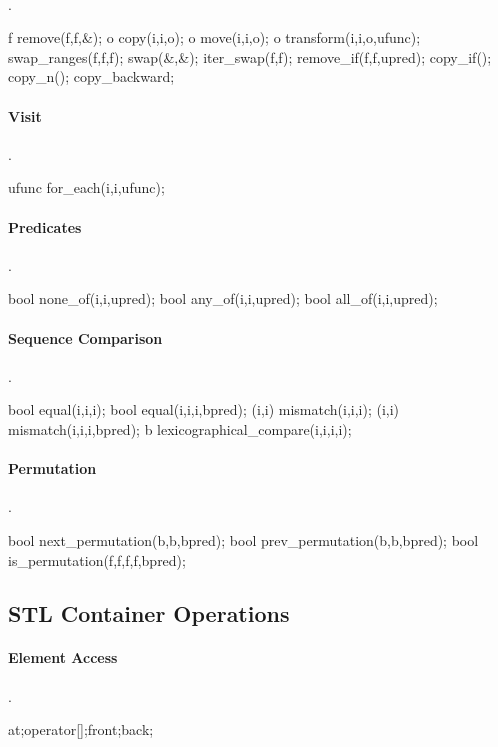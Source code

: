 \paragraph{}{.}
\begin{code}
f remove(f,f,&); o copy(i,i,o); o move(i,i,o);
o transform(i,i,o,ufunc);
swap_ranges(f,f,f); swap(&,&); iter_swap(f,f);
remove_if(f,f,upred); copy_if(); copy_n(); copy_backward;
\end{code}

\paragraph{Visit}{.}
\begin{code}
ufunc for_each(i,i,ufunc);
\end{code}

\paragraph{Predicates}{.}
\begin{code}
bool none_of(i,i,upred);
bool any_of(i,i,upred);
bool all_of(i,i,upred);
\end{code}

\paragraph{Sequence Comparison}{.}
\begin{code}
bool equal(i,i,i); bool equal(i,i,i,bpred);
(i,i) mismatch(i,i,i); (i,i) mismatch(i,i,i,bpred);
b lexicographical_compare(i,i,i,i);
\end{code}

\paragraph{Permutation}{.}
\begin{code}
bool next_permutation(b,b,bpred);
bool prev_permutation(b,b,bpred);
bool is_permutation(f,f,f,f,bpred);
\end{code}

\subsection*{STL Container Operations}
\paragraph{Element Access}{.}
\begin{code}
at;operator[];front;back;
\end{code}

